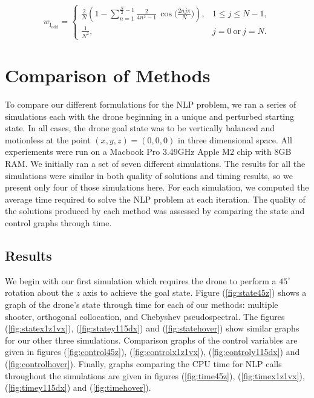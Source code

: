 \documentclass[]{article}
\begin{document}
	\[
        w_{\mathrm{j_{odd}}} =
        \begin{cases}
        \displaystyle
        \frac{2}{N}\!\left(
        1 - \sum_{n=1}^{\frac{N}{2}-1} \frac{2}{4n^{2}-1}\,
        \cos\!\Big(\tfrac{2 n j \pi}{N}\Big)
        \right), & 1 \le j \le N-1, \\[2ex]
        \displaystyle \frac{1}{N^{2}}, & j=0\ \text{or}\ j=N.
        \end{cases}
        \]

\section*{Comparison of Methods}

To compare our different formulations for the NLP problem, we ran a series of simulations each with the drone beginning in a unique and perturbed starting state. In all cases, the drone goal state was to be vertically balanced and motionless at the point $(x,y,z) = (0, 0, 0)$ in three dimensional space. All experiements were run on a Macbook Pro  3.49GHz Apple M2 chip with 8GB RAM. We initially ran a set of seven different simulations. The results for all the simulations were similar in both quality of solutions and timing results, so we present only four of those simulations here.  For each simulation, we computed the average time required to solve the NLP problem at each iteration. The quality of the solutions produced by each method was assessed by comparing the state and control graphs through time. 


\subsection*{Results}
We begin with our first simulation which requires the drone to perform a $45^{\circ}$ rotation about the $z$ axis to achieve the goal state. 
Figure (\ref{fig:state45z}) shows a graph of the drone's state through time for each of our methods:  multiple shooter, orthogonal collocation, and Chebyshev pseudospectral. The figures  (\ref{fig:statex1z1vx}), (\ref{fig:statey115dx}) and (\ref{fig:statehover}) show similar graphs for our other three simulations.  Comparison graphs of the control variables are given in figures (\ref{fig:control45z}), (\ref{fig:controlx1z1vx}), (\ref{fig:controly115dx}) and (\ref{fig:controlhover}). Finally, graphs comparing the CPU time for NLP calls throughout the simulations are given in figures (\ref{fig:time45z}), (\ref{fig:timex1z1vx}), (\ref{fig:timey115dx}) and (\ref{fig:timehover}). 
 
\end{document}
